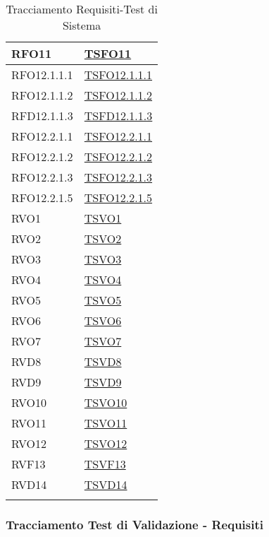 \begin{longtable}{|>{\centering}m{5cm}|m{5cm}<{\centering}|}
	RFO11 & \hyperlink{TSFO11}{TSFO11} \\ \hline
	RFO12.1.1.1 & \hyperlink{TSFO12.1.1.1}{TSFO12.1.1.1} \\ \hline
	RFO12.1.1.2 & \hyperlink{TSFO12.1.1.2}{TSFO12.1.1.2} \\ \hline
	RFD12.1.1.3 & \hyperlink{TSFD12.1.1.3}{TSFD12.1.1.3} \\ \hline
	RFO12.2.1.1 & \hyperlink{TSFO12.2.1.1}{TSFO12.2.1.1} \\ \hline
	RFO12.2.1.2 & \hyperlink{TSFO12.2.1.2}{TSFO12.2.1.2} \\ \hline
	RFO12.2.1.3 & \hyperlink{TSFO12.2.1.3}{TSFO12.2.1.3} \\ \hline
	RFO12.2.1.5 & \hyperlink{TSFO12.2.1.5}{TSFO12.2.1.5} \\ \hline
	RVO1 & \hyperlink{TSVO1}{TSVO1} \\ \hline
	RVO2 & \hyperlink{TSVO2}{TSVO2} \\ \hline
	RVO3 & \hyperlink{TSVO3}{TSVO3} \\ \hline
	RVO4 & \hyperlink{TSVO4}{TSVO4} \\ \hline
	RVO5 & \hyperlink{TSVO5}{TSVO5} \\ \hline
	RVO6 & \hyperlink{TSVO6}{TSVO6} \\ \hline
	RVO7 & \hyperlink{TSVO7}{TSVO7} \\ \hline
	RVD8 & \hyperlink{TSVD8}{TSVD8} \\ \hline
	RVD9 & \hyperlink{TSVD9}{TSVD9} \\ \hline
	RVO10 & \hyperlink{TSVO10}{TSVO10} \\ \hline
	RVO11 & \hyperlink{TSVO11}{TSVO11} \\ \hline
	RVO12 & \hyperlink{TSVO12}{TSVO12} \\ \hline
	RVF13 & \hyperlink{TSVF13}{TSVF13} \\ \hline
	RVD14 & \hyperlink{TSVD14}{TSVD14} \\ \hline	

	\caption[Tracciamento Requisiti-Test di Sistema]{Tracciamento Requisiti-Test di Sistema}
	\label{tabella:requi-ts}
\end{longtable}
\clearpage

\subsubsection{Tracciamento Test di Validazione - Requisiti}

